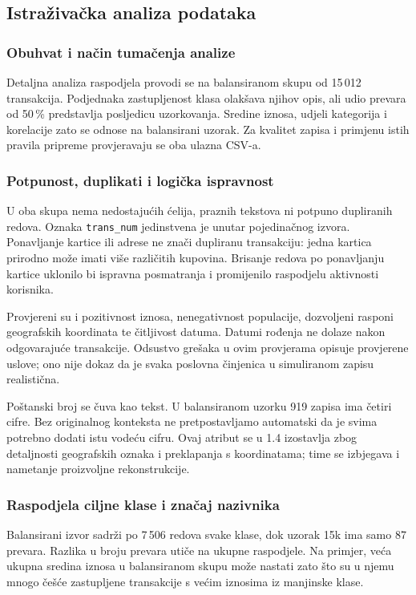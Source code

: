 \clearpage
\subsection{Istraživačka analiza podataka}\label{sec:analiza}
\subsubsection*{Obuhvat i način tumačenja analize}
Detaljna analiza raspodjela provodi se na balansiranom skupu od 15\,012 transakcija.
Podjednaka zastupljenost klasa olakšava njihov opis, ali udio prevara od 50\,\%
predstavlja posljedicu uzorkovanja. Sredine iznosa, udjeli kategorija i korelacije
zato se odnose na balansirani uzorak. Za kvalitet zapisa i primjenu istih pravila
pripreme provjeravaju se oba ulazna CSV-a.

\subsubsection*{Potpunost, duplikati i logička ispravnost}
U oba skupa nema nedostajućih ćelija, praznih tekstova ni potpuno dupliranih redova.
Oznaka \texttt{trans\_num} jedinstvena je unutar pojedinačnog izvora. Ponavljanje
kartice ili adrese ne znači dupliranu transakciju: jedna kartica prirodno može imati
više različitih kupovina. Brisanje redova po ponavljanju kartice uklonilo bi
ispravna posmatranja i promijenilo raspodjelu aktivnosti korisnika.

Provjereni su i pozitivnost iznosa, nenegativnost populacije, dozvoljeni rasponi
geografskih koordinata te čitljivost datuma. Datumi rođenja ne dolaze nakon
odgovarajuće transakcije. Odsustvo grešaka u ovim provjerama opisuje provjerene
uslove; ono nije dokaz da je svaka poslovna činjenica u simuliranom zapisu realistična.


Poštanski broj se čuva kao tekst. U balansiranom uzorku 919 zapisa ima četiri cifre.
Bez originalnog konteksta ne pretpostavljamo automatski da je svima potrebno dodati
istu vodeću cifru. Ovaj atribut se u 1.4 izostavlja zbog detaljnosti geografskih oznaka
i preklapanja s koordinatama; time se izbjegava i nametanje proizvoljne rekonstrukcije.

\subsubsection*{Raspodjela ciljne klase i značaj nazivnika}
Balansirani izvor sadrži po 7\,506 redova svake klase, dok uzorak 15k ima samo 87
prevara. Razlika u broju prevara utiče na ukupne raspodjele. Na primjer, veća ukupna
sredina iznosa u balansiranom skupu može nastati zato što su u njemu mnogo češće
zastupljene transakcije s većim iznosima iz manjinske klase.

